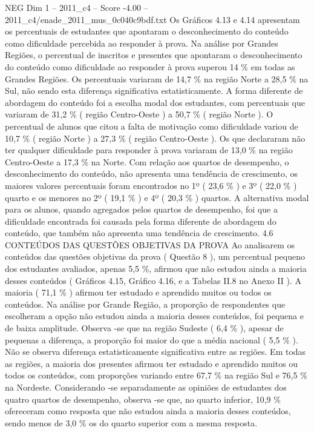 \begin{textsample}{NEG Dim 1 – 2011\_c4 – Score -4.00 – 2011\_c4/enade\_2011\_mus\_0c040c9bdf.txt}
Os Gráficos 4.13 e 4.14 apresentam os percentuais de estudantes que apontaram o desconhecimento do conteúdo como dificuldade percebida ao responder à prova.
Na análise por Grandes Regiões, o percentual de inscritos e presentes que apontaram o desconhecimento do conteúdo como dificuldade ao responder à prova superou 14 \% em todas as Grandes Regiões.
Os percentuais variaram de 14,7 \% na região Norte a 28,5 \% na Sul, não sendo esta diferença significativa estatisticamente.
A forma diferente de abordagem do conteúdo foi a escolha modal dos estudantes, com percentuais que variaram de 31,2 \% ( região Centro-Oeste ) a 50,7 \% ( região Norte ).
O percentual de alunos que citou a falta de motivação como dificuldade variou de 10,7 \% ( região Norte ) a 27,3 \% ( região Centro-Oeste ).
Os que declararam não ter qualquer dificuldade para responder à prova variaram de 13,0 \% na região Centro-Oeste a 17,3 \% na Norte.
Com relação aos quartos de desempenho, o desconhecimento do conteúdo, não apresenta uma tendência de crescimento, os maiores valores percentuais foram encontrados no 1º ( 23,6 \% ) e 3º ( 22,0 \% ) quarto e os menores no 2º ( 19,1 \% ) e 4º ( 20,3 \% ) quartos.
A alternativa modal para os alunos, quando agregados pelos quartos de desempenho, foi que a dificuldade encontrada foi causada pela forma diferente de abordagem do conteúdo, que também não apresenta uma tendência de crescimento. 4.6 CONTEÚDOS DAS QUESTÕES OBJETIVAS DA PROVA Ao analisarem os conteúdos das questões objetivas da prova ( Questão 8 ), um percentual pequeno dos estudantes avaliados, apenas 5,5 \%, afirmou que não estudou ainda a maioria desses conteúdos ( Gráficos 4.15, Gráfico 4.16, e a Tabelas II.8 no Anexo II ).
A maioria ( 71,1 \% ) afirmou ter estudado e aprendido muitos ou todos os conteúdos.
Na análise por Grande Região, a proporção de respondentes que escolheram a opção não estudou ainda a maioria desses conteúdos, foi pequena e de baixa amplitude.
Observa -se que na região Sudeste ( 6,4 \% ), apesar de pequenas a diferença, a proporção foi maior do que a média nacional ( 5,5 \% ).
Não se observa diferença estatisticamente significativa entre as regiões.
Em todas as regiões, a maioria dos presentes afirmou ter estudado e aprendido muitos ou todos os conteúdos, com proporções variando entre 67,7 \% na região Sul e 76,5 \% na Nordeste.
Considerando -se separadamente as opiniões de estudantes dos quatro quartos de desempenho, observa -se que, no quarto inferior, 10,9 \% ofereceram como resposta que não estudou ainda a maioria desses conteúdos, sendo menos de 3,0 \% os do quarto superior com a mesma resposta.

\end{textsample}
